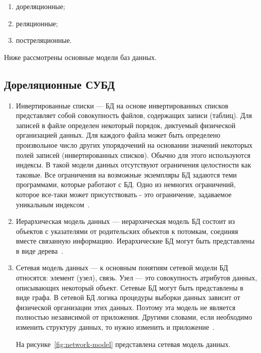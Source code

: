\begin{enumerate}[label=\arabic*)]
    \item дореляционные;
    \item реляционные;
    \item постреляционные.
\end{enumerate}

Ниже рассмотрены основные модели баз данных.

\subsection{Дореляционные СУБД}
\begin{enumerate}[label=\arabic*.]
    \item Инвертированные списки --- БД на основе инвертированных списков представляет собой совокупность файлов, содержащих записи (таблиц).
    Для записей в файле определен некоторый порядок, диктуемый физической организацией данных.
    Для каждого файла может быть определено произвольное число других упорядочений на основании значений некоторых полей записей (инвертированных списков).
    Обычно для этого используются индексы.
    В такой модели данных отсутствуют ограничения целостности как таковые.
    Все ограничения на возможные экземпляры БД задаются теми программами, которые работают с БД.
    Одно из немногих ограничений, которое все-таки может присутствовать - это ограничение, задаваемое уникальным индексом~\cite{lekcii}.
    \item Иерархическая модель данных --- иерархическая модель БД состоит из объектов с указателями от родительских объектов к потомкам, соединяя вместе связанную информацию.
    Иерархические БД могут быть представлены в виде дерева~\cite{lekcii}.
    \item Сетевая модель данных --- к основным понятиям сетевой модели БД относятся: элемент (узел), связь.
    Узел — это совокупность атрибутов данных, описывающих некоторый объект.
    Сетевые БД могут быть представлены в виде графа.
    В сетевой БД логика процедуры выборки данных зависит от физической организации этих данных.
    Поэтому эта модель не является полностью независимой от приложения.
    Другими словами, если необходимо изменить структуру данных, то нужно изменить и приложение~\cite{lekcii}.

    На рисунке~\ref{fig:network-model} представлена сетевая модель данных.


\end{enumerate}

